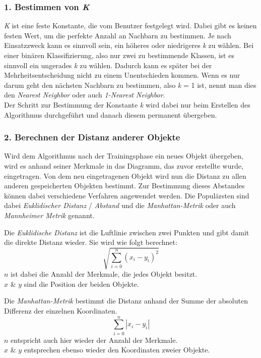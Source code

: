 \subsubsection{1. Bestimmen von \textit{K}}
\textit{K} ist eine feste Konstante, die vom Benutzer festgelegt wird. Dabei gibt es keinen festen Wert, um die perfekte Anzahl an Nachbarn zu bestimmen. Je nach Einsatzzweck kann es sinnvoll sein, ein höheres oder niedrigeres \textit{k} zu wählen. Bei einer binären Klassifizierung, also nur zwei zu bestimmende Klassen, ist es sinnvoll ein ungerades \textit{k} zu wählen. Dadurch kann es später bei der Mehrheitsentscheidung nicht zu einem Unentschieden kommen. Wenn es nur darum geht den nächsten Nachbarn zu bestimmen, also \textit{k} = 1 ist, nennt man dies den \textit{Nearest Neighbor} oder auch \textit{1-Nearest Neighbor}.\\\hfill
Der Schritt zur Bestimmung der Konstante \textit{k} wird dabei nur beim Erstellen des Algorithmus durchgeführt und danach diesem permanent übergeben.

\subsubsection{2. Berechnen der Distanz anderer Objekte}
Wird dem Algorithmus nach der Trainingsphase ein neues Objekt übergeben, wird es anhand seiner Merkmale in das Diagramm, das zuvor erstellte wurde, eingetragen. Von dem neu eingetragenen Objekt wird nun die Distanz zu allen anderen gespeicherten Objekten bestimmt. Zur Bestimmung dieses Abstandes können dabei verschiedene Verfahren angewendet werden. Die Populärsten sind dabei \textit{Euklidischer Distanz} / \textit{Abstand} und die \textit{Manhattan-Metrik} oder auch \textit{Mannheimer Metrik} genannt.\par

Die \textit{Euklidische Distanz} ist die Luftlinie zwischen zwei Punkten und gibt damit die direkte Distanz wieder. Sie wird wie folgt berechnet:
\[\sqrt{\sum_{i=0}^n(x_i - y_i)^2}\]
$n$ ist dabei die Anzahl der Merkmale, die jedes Objekt besitzt.\\\hfill
$x$ \& $y$ sind die Position der beiden Objekte.\par

Die \textit{Manhattan-Metrik} bestimmt die Distanz anhand der Summe der absoluten Differenz der einzelnen Koordinaten.
\[\sum_{i=0}^n|x_i - y_i|\]
$n$ entspricht auch hier wieder der Anzahl der Merkmale.\\\hfill
$x$ \& $y$ entsprechen ebenso wieder den Koordinaten zweier Objekte.

